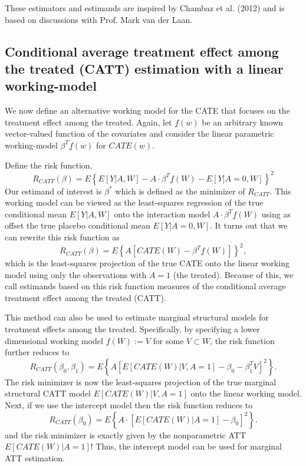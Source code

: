 \documentclass[article]{jss}
\begin{document}
\noindent  These estimators and estimands are inspired by Chambaz et al. (2012) and is based on discussions with Prof. Mark van der Laan.\nocite{ChambazLaanVarimp}

\subsection{Conditional average treatment effect among the treated (CATT) estimation with a linear working-model}

We now define an alternative working model for the CATE that focuses on the treatment effect among the treated. Again, let $\underline{f}(w)$ be an arbitrary known vector-valued function of the covariates and consider the linear parametric working-model $\beta^T \underline{f}(w)$ for $CATE(w)$.

\noindent Define the risk function,
$$R_{CATT}(\beta) = E \left\{E[Y|A,W] - A \cdot \beta^T \underline{f}(W) - E[Y|A=0,W]\right\}^2$$
Our estimand of interest is $\beta^*$ which is defined as the minimizer of $R_{CATT}$. This working model can be viewed as the least-squares regression of the true conditional mean $E[Y|A,W]$ onto the interaction model $A \cdot \beta^T \underline{f}(W) $ using as offset the true placebo conditional mean $E[Y|A=0,W]$. It turns out that we can rewrite this risk function as 
$$R_{CATT}(\beta) = E \left\{A \left[CATE(W) - \beta^T \underline{f}(W)  \right]  \right\}^2,$$
which is the least-squares projection of the true CATE onto the linear working model using only the observations with $A=1$ (the treated). Because of this, we call estimands based on this risk function measures of the conditional average treatment effect among the treated (CATT).

This method can also be used to estimate marginal structural models for treatment effects among the treated. Specifically, by specifying a lower dimensional working model $\underline{f}(W) := V$ for some $V \subset W$, the risk function further reduces to
$$R_{CATT}(\beta_0, \beta_1) = E \left\{A\left[E[CATE(W)|V,A=1] - \beta_0 - \beta_1^T V\right]^2 \right\}.$$
The risk minimizer is now the least-squares projection of the true marginal structural CATT model $E[CATE(W)|V, A=1]$ onto the linear working model. Next, if we use the intercept model then the risk function reduces to
$$R_{CATT}(\beta_0) = E \left\{ A\cdot \left[E[CATE(W)|A=1] - \beta_0 \right]^2 \right\}.$$
and the risk minimizer is exactly given by the nonparametric ATT $E[CATE(W)|A=1]$! Thus, the intercept model can be used for marginal ATT estimation.
\end{document}
